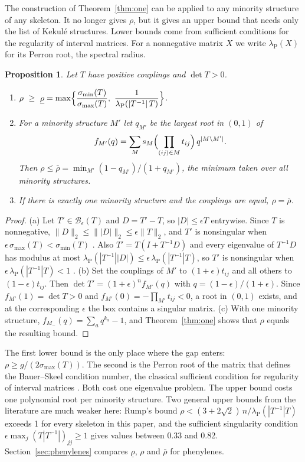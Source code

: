 \documentclass[11pt]{article}
\newtheorem{proposition}{Proposition}
\newcommand{\Bx}{\mathcal{B}}
\newcommand{\lP}{\lambda_{\mathrm{P}}}
\begin{document}
The construction of Theorem~\ref{thm:one} can be applied to any minority structure of any skeleton. It no longer gives $\rho$, but it gives an upper bound that needs only the list of Kekul\'e structures. Lower bounds come from sufficient conditions for the regularity of interval matrices. For a nonnegative matrix $X$ we write $\lP(X)$ for its Perron root, the spectral radius.

\begin{proposition}
\label{prop:bounds}
Let $T$ have positive couplings and $\det T>0$.
\begin{enumerate}
\item[(a)] $\rho\ \ge\ \underline\rho=\max\Bigl\{\dfrac{\sigma_{\min}(T)}{\sigma_{\max}(T)},\ \dfrac{1}{\lP(|T^{-1}|\,T)}\Bigr\}$.
\item[(b)] For a minority structure $M'$ let $q_{M'}$ be the largest root in $(0,1)$ of
\begin{equation}
f_{M'}(q)=\sum_{M}s_M\Bigl(\prod_{(ij)\in M}t_{ij}\Bigr)\,q^{|M\setminus M'|}.
\label{eq:fM}
\end{equation}
Then $\rho\le\bar\rho=\min_{M'}(1-q_{M'})/(1+q_{M'})$, the minimum taken over all minority structures.
\item[(c)] If there is exactly one minority structure and the couplings are equal, $\rho=\bar\rho$.
\end{enumerate}
\end{proposition}

\begin{proof}
(a) Let $T'\in\Bx_\epsilon(T)$ and $D=T'-T$, so $|D|\le\epsilon T$ entrywise. Since $T$ is nonnegative, $\|D\|_2\le\||D|\|_2\le\epsilon\|T\|_2$, and $T'$ is nonsingular when $\epsilon\,\sigma_{\max}(T)<\sigma_{\min}(T)$ \citep{RexRohn1998}. Also $T'=T(I+T^{-1}D)$ and every eigenvalue of $T^{-1}D$ has modulus at most $\lP(|T^{-1}||D|)\le\epsilon\,\lP(|T^{-1}|T)$, so $T'$ is nonsingular when $\epsilon\,\lP(|T^{-1}|T)<1$ \citep{Rohn2009,Rump1999}. (b) Set the couplings of $M'$ to $(1+\epsilon)t_{ij}$ and all others to $(1-\epsilon)t_{ij}$. Then $\det T'=(1+\epsilon)^nf_{M'}(q)$ with $q=(1-\epsilon)/(1+\epsilon)$. Since $f_{M'}(1)=\det T>0$ and $f_{M'}(0)=-\prod_{M'}t_{ij}<0$, a root in $(0,1)$ exists, and at the corresponding $\epsilon$ the box contains a singular matrix. (c) With one minority structure, $f_{M_-}(q)=\sum_aq^{k_a}-1$, and Theorem~\ref{thm:one} shows that $\rho$ equals the resulting bound.
\end{proof}

The first lower bound is the only place where the gap enters: $\rho\ge g/(2\sigma_{\max}(T))$. The second is the Perron root of the matrix that defines the Bauer--Skeel condition number, the classical sufficient condition for regularity of interval matrices \citep{Rohn2009}. Both cost one eigenvalue problem. The upper bound costs one polynomial root per minority structure. Two general upper bounds from the literature are much weaker here: Rump's bound $\rho<(3+2\sqrt2)\,n/\lP(|T^{-1}|T)$ \citep{Rump1999} exceeds 1 for every skeleton in this paper, and the sufficient singularity condition $\epsilon\max_j(T|T^{-1}|)_{jj}\ge1$ \citep{Rohn1989,Rohn2009} gives values between 0.33 and 0.82. Section~\ref{sec:phenylenes} compares $\underline\rho$, $\rho$ and $\bar\rho$ for phenylenes.
\end{document}
